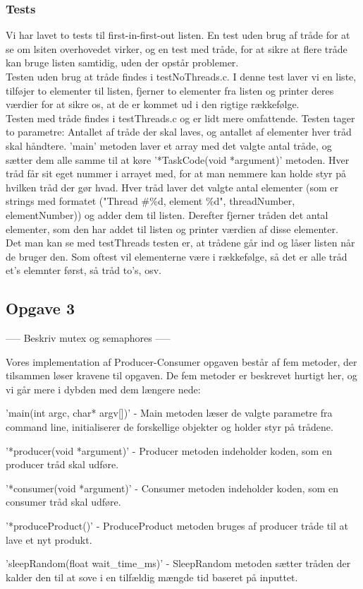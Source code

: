 \subsubsection{Tests}
\label{O2_Tests}
Vi har lavet to tests til first-in-first-out listen. En test uden brug af tråde for at se om lsiten overhovedet virker, og en test med tråde, for at sikre at flere tråde kan bruge listen samtidig, uden der opstår problemer.
\\Testen uden brug at tråde findes i testNoThreads.c. I denne test laver vi en liste, tilføjer to elementer til listen, fjerner to elementer fra listen og printer deres værdier for at sikre os, at de er kommet ud i den rigtige rækkefølge. 
\\Testen med tråde findes i testThreads.c og er lidt mere omfattende. Testen tager to parametre: Antallet af tråde der skal laves, og antallet af elementer hver tråd skal håndtere. 'main' metoden laver et array med det valgte antal tråde, og sætter dem alle samme til at køre '*TaskCode(void *argument)' metoden. Hver tråd får sit eget nummer i arrayet med, for at man nemmere kan holde styr på hvilken tråd der gør hvad. Hver tråd laver det valgte antal elementer (som er strings med formatet ("Thread \#\%d, element \%d", threadNumber, elementNumber)) og adder dem til listen. Derefter fjerner tråden det antal elementer, som den har addet til listen og printer værdien af disse elementer. 
\\Det man kan se med testThreads testen er, at trådene går ind og låser listen når de bruger den. Som oftest vil elementerne være i rækkefølge, så det er alle tråd et's elemnter først, så tråd to's, osv.

\subsection{Opgave 3}
\label{O3}
----- Beskriv mutex og semaphores -----

Vores implementation af Producer-Consumer opgaven består af fem metoder, der tilsammen løser kravene til opgaven. De fem metoder er beskrevet hurtigt her, og vi går mere i dybden med dem længere nede: 
\begin{my_enumerate}
    \item 'main(int argc, char* argv[])' - Main metoden læser de valgte parametre fra command line, initialiserer de forskellige objekter og holder styr på trådene.
    \item '*producer(void *argument)' - Producer metoden indeholder koden, som en producer tråd skal udføre. 
    \item '*consumer(void *argument)' - Consumer metoden indeholder koden, som en consumer tråd skal udføre. 
    \item '*produceProduct()' - ProduceProduct metoden bruges af producer tråde til at lave et nyt produkt.
    \item 'sleepRandom(float wait_time_ms)' - SleepRandom metoden sætter tråden der kalder den til at sove i en tilfældig mængde tid baseret på inputtet.
\end{my_enumerate}

